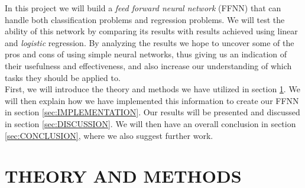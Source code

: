 \documentclass[english,notitlepage,reprint,nofootinbib]{revtex4-1}  %
\begin{document}
In this project we will build a \textit{feed forward neural network} (FFNN) that can handle both classification problems and regression problems. We will test the ability of this network by comparing its results with results achieved using linear and \textit{logistic} regression. By analyzing the results we hope to uncover some of the pros and cons of using simple neural networks, thus giving us an indication of their usefulness and effectiveness, and also increase our understanding of which tasks they should be applied to.  
\\

First, we will introduce the theory and methods we have utilized in section \ref{sec:METHODS}. We will then explain how we have implemented this information to create our FFNN in section \ref{sec:IMPLEMENTATION}. Our results will be presented and discussed in section \ref{sec:DISCUSSION}. We will then have an overall conclusion in section \ref{sec:CONCLUSION}, where we also suggest further work.
\section{THEORY AND METHODS}
\label{sec:METHODS}
\end{document}
